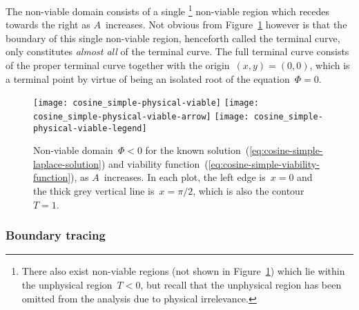 The non-viable domain consists of a single%
\footnote{
  There also exist non-viable regions
  (not shown in Figure~\ref{fig:cosine_simple-physical-viable})
  which lie within the unphysical region~$T < 0$,
  but recall that the unphysical region has been omitted from the analysis
  due to physical irrelevance.
}
non-viable region which recedes towards the right as $A$~increases.
Not obvious from Figure~\ref{fig:cosine_simple-physical-viable} however
is that the boundary of this single non-viable region,
henceforth called the  terminal curve,
only constitutes \emph{almost all} of the terminal curve.
The full terminal curve consists of the proper terminal curve
together with the origin~$(x, y) = (0, 0)$,
which is a terminal point
by virtue of being an isolated root of the equation~$\Phi = 0$.

\begin{figure}
  \centering
  \texttt{[image: cosine\_simple-physical-viable]}
  \texttt{[image: cosine\_simple-physical-viable-arrow]}
  \texttt{[image: cosine\_simple-physical-viable-legend]}
  \caption{
    Non-viable domain~$\Phi < 0$
    for the known solution~(\ref{eq:cosine-simple-laplace-solution})
    and viability function~(\ref{eq:cosine-simple-viability-function}),
    as $A$~increases.
    In each plot, the left edge is~$x = 0$
    and the thick grey vertical line is~$x = \pi/2$,
    which is also the contour~$T = 1$.
  }
  \label{fig:cosine_simple-physical-viable}
\end{figure}

\subsubsection{Boundary tracing}
\label{sec:cartesian.cosine.simple.tracing}


